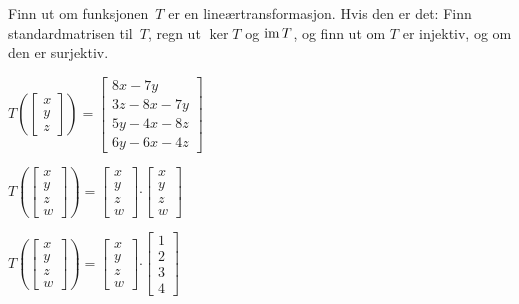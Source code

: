 

\begin{oppgave}
Finn ut om funksjonen~$T$ er en lineærtransformasjon.  Hvis den er
det: Finn standardmatrisen til~$T$, regn ut $\ker T$ og $\operatorname{im} T$, og
finn ut om $T$ er injektiv, og om den er surjektiv.
\begin{punkt}
$T\left( \begin{bmatrix}
x\\
y\\
z
\end{bmatrix} \right)=\begin{bmatrix}
8x-7y\\
3z-8x-7y\\
5y-4x-8z\\
6y-6x-4z
\end{bmatrix}$
\end{punkt}

\begin{punkt}
$T\left( \begin{bmatrix}
x\\
y\\
z\\
w
\end{bmatrix} \right)=\begin{bmatrix}
x\\
y\\
z\\
w
\end{bmatrix}\boldsymbol{\cdot }\begin{bmatrix}
x\\
y\\
z\\
w
\end{bmatrix}$
\end{punkt}

\begin{punkt}
$T\left( \begin{bmatrix}
x\\
y\\
z\\
w
\end{bmatrix} \right)=\begin{bmatrix}
x\\
y\\
z\\
w
\end{bmatrix}\boldsymbol{\cdot }\begin{bmatrix}
1\\
2\\
3\\
4
\end{bmatrix}$
\end{punkt}


\end{oppgave}

